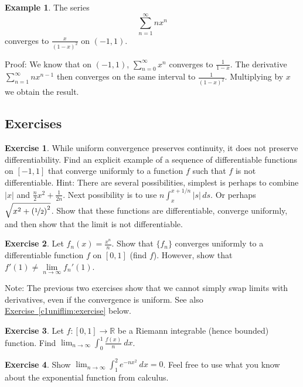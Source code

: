 \documentclass[12pt]{book}
\newcommand{\abs}[1]{\left\lvert {#1} \right\rvert}
\newcommand{\R}{{\mathbb{R}}}
\theoremstyle{plain}
\theoremstyle{remark}
\theoremstyle{definition}
\newenvironment{exnote}{\small}{}
\theoremstyle{exercise}
\newtheorem{exercise}{Exercise}[section]
\theoremstyle{example}
\newtheorem{example}[thm]{Example}
\newcommand{\exerciseref}[1]{\hyperref[#1]{Exercise~\ref*{#1}}}
\begin{document}
\begin{example}
The series
\begin{equation*}
\sum_{n=1}^\infty n x^n
\end{equation*}
converges to $\frac{x}{{(1-x)}^2}$ on $(-1,1)$.

Proof:
We know that on $(-1,1)$, $\sum_{n=0}^\infty x^n$ converges to
$\frac{1}{1-x}$.  The derivative $\sum_{n=1}^\infty n x^{n-1}$ then converges
on the same interval to $\frac{1}{{(1-x)}^2}$.  Multiplying by $x$
we obtain the result.
\end{example}

\subsection{Exercises}

\begin{exercise}
While uniform convergence preserves continuity, it does not preserve
differentiability.  Find an explicit example of a sequence of
differentiable functions on $[-1,1]$ that converge uniformly to
a function $f$ such that $f$ is not differentiable.
Hint: There are several possibilities,
simplest is perhaps to combine $\abs{x}$ and $\frac{n}{2}x^2 +
\frac{1}{2n}$.
Next possibility is to use $n \int_x^{x+1/n} \abs{s} \,ds$.
Or perhaps $\sqrt{x^2+{(\nicefrac{1}{2})}^2}$.  Show that these functions are differentiable,
converge uniformly, and then show that the limit is not differentiable.
\end{exercise}

\begin{exercise}
Let $f_n(x) = \frac{x^n}{n}$.  Show that $\{ f_n \}$ converges uniformly to
a differentiable function $f$ on $[0,1]$ (find $f$).  However, show that
$f'(1) \not= \lim\limits_{n\to\infty} f_n'(1)$.
\end{exercise}

\begin{exnote}
Note: The previous two exercises show that
we cannot simply swap limits with derivatives, even if the convergence is
uniform.  See also \exerciseref{c1uniflim:exercise} below.
\end{exnote}

\begin{exercise}
Let $f \colon [0,1] \to \R$ be a Riemann integrable (hence bounded)
function.  Find
$\displaystyle \lim_{n\to\infty} \int_0^1 \frac{f(x)}{n} ~dx$.
\end{exercise}

\begin{exercise}
Show
$\displaystyle \lim_{n\to\infty} \int_1^2 e^{-nx^2} ~dx = 0$.  Feel free to
use
what you know about the exponential function from calculus.
\end{exercise}
\end{document}
